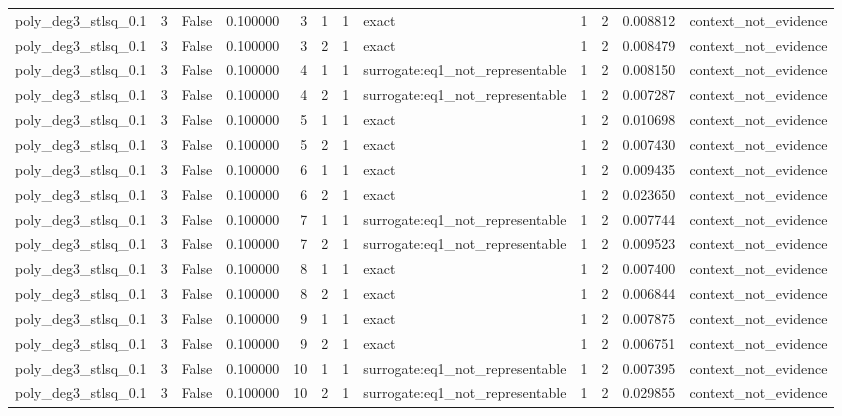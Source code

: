 \begin{tabular}{lrrrrrrlrrrl}
poly\_deg3\_stlsq\_0.1 & 3 & False & 0.100000 & 3 & 1 & 1 & exact & 1 & 2 & 0.008812 & context\_not\_evidence \\
poly\_deg3\_stlsq\_0.1 & 3 & False & 0.100000 & 3 & 2 & 1 & exact & 1 & 2 & 0.008479 & context\_not\_evidence \\
poly\_deg3\_stlsq\_0.1 & 3 & False & 0.100000 & 4 & 1 & 1 & surrogate:eq1\_not\_representable & 1 & 2 & 0.008150 & context\_not\_evidence \\
poly\_deg3\_stlsq\_0.1 & 3 & False & 0.100000 & 4 & 2 & 1 & surrogate:eq1\_not\_representable & 1 & 2 & 0.007287 & context\_not\_evidence \\
poly\_deg3\_stlsq\_0.1 & 3 & False & 0.100000 & 5 & 1 & 1 & exact & 1 & 2 & 0.010698 & context\_not\_evidence \\
poly\_deg3\_stlsq\_0.1 & 3 & False & 0.100000 & 5 & 2 & 1 & exact & 1 & 2 & 0.007430 & context\_not\_evidence \\
poly\_deg3\_stlsq\_0.1 & 3 & False & 0.100000 & 6 & 1 & 1 & exact & 1 & 2 & 0.009435 & context\_not\_evidence \\
poly\_deg3\_stlsq\_0.1 & 3 & False & 0.100000 & 6 & 2 & 1 & exact & 1 & 2 & 0.023650 & context\_not\_evidence \\
poly\_deg3\_stlsq\_0.1 & 3 & False & 0.100000 & 7 & 1 & 1 & surrogate:eq1\_not\_representable & 1 & 2 & 0.007744 & context\_not\_evidence \\
poly\_deg3\_stlsq\_0.1 & 3 & False & 0.100000 & 7 & 2 & 1 & surrogate:eq1\_not\_representable & 1 & 2 & 0.009523 & context\_not\_evidence \\
poly\_deg3\_stlsq\_0.1 & 3 & False & 0.100000 & 8 & 1 & 1 & exact & 1 & 2 & 0.007400 & context\_not\_evidence \\
poly\_deg3\_stlsq\_0.1 & 3 & False & 0.100000 & 8 & 2 & 1 & exact & 1 & 2 & 0.006844 & context\_not\_evidence \\
poly\_deg3\_stlsq\_0.1 & 3 & False & 0.100000 & 9 & 1 & 1 & exact & 1 & 2 & 0.007875 & context\_not\_evidence \\
poly\_deg3\_stlsq\_0.1 & 3 & False & 0.100000 & 9 & 2 & 1 & exact & 1 & 2 & 0.006751 & context\_not\_evidence \\
poly\_deg3\_stlsq\_0.1 & 3 & False & 0.100000 & 10 & 1 & 1 & surrogate:eq1\_not\_representable & 1 & 2 & 0.007395 & context\_not\_evidence \\
poly\_deg3\_stlsq\_0.1 & 3 & False & 0.100000 & 10 & 2 & 1 & surrogate:eq1\_not\_representable & 1 & 2 & 0.029855 & context\_not\_evidence \\

\end{tabular}
